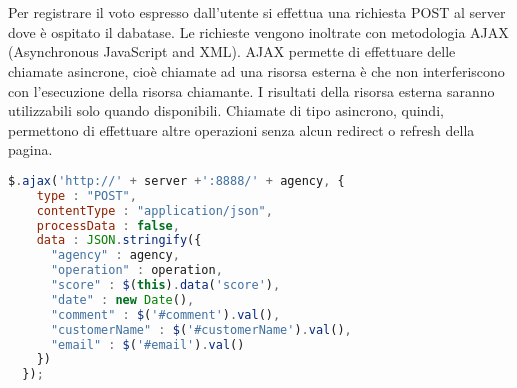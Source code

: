\\\\
Per registrare il voto espresso dall'utente si effettua una richiesta POST al
server dove è ospitato il dabatase. Le richieste vengono inoltrate con
metodologia AJAX (Asynchronous JavaScript and XML). AJAX permette di
effettuare delle chiamate asincrone, cioè chiamate ad una risorsa
esterna è che non interferiscono con l'esecuzione della risorsa chiamante. I
risultati della risorsa esterna saranno utilizzabili solo quando disponibili.
Chiamate di tipo asincrono, quindi, permettono di effettuare altre operazioni
senza alcun redirect o refresh della pagina.

\begin{lstlisting}[language=JavaScript] 
$.ajax('http://' + server +':8888/' + agency, { 
    type : "POST",
    contentType : "application/json",
    processData : false,
    data : JSON.stringify({
      "agency" : agency,
      "operation" : operation,
      "score" : $(this).data('score'),
      "date" : new Date(),
      "comment" : $('#comment').val(),
      "customerName" : $('#customerName').val(),
      "email" : $('#email').val()
    })
  });
\end{lstlisting}
